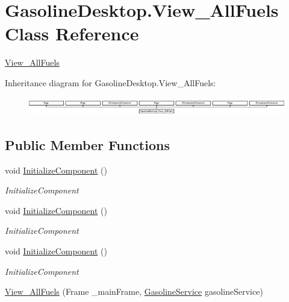 \hypertarget{class_gasoline_desktop_1_1_view___all_fuels}{}\section{Gasoline\+Desktop.\+View\+\_\+\+All\+Fuels Class Reference}
\label{class_gasoline_desktop_1_1_view___all_fuels}


\mbox{\hyperlink{class_gasoline_desktop_1_1_view___all_fuels}{View\+\_\+\+All\+Fuels}}  


Inheritance diagram for Gasoline\+Desktop.\+View\+\_\+\+All\+Fuels\+:\begin{figure}[H]
\begin{center}
\leavevmode
\includegraphics[height=0.804020cm]{class_gasoline_desktop_1_1_view___all_fuels}
\end{center}
\end{figure}
\subsection*{Public Member Functions}
\begin{DoxyCompactItemize}
\item 
void \mbox{\hyperlink{class_gasoline_desktop_1_1_view___all_fuels_a5b5ef4ae6f2ee05ce8ec6b8af1ba331f}{Initialize\+Component}} ()
\begin{DoxyCompactList}\small\item\em Initialize\+Component \end{DoxyCompactList}\item 
void \mbox{\hyperlink{class_gasoline_desktop_1_1_view___all_fuels_a5b5ef4ae6f2ee05ce8ec6b8af1ba331f}{Initialize\+Component}} ()
\begin{DoxyCompactList}\small\item\em Initialize\+Component \end{DoxyCompactList}\item 
void \mbox{\hyperlink{class_gasoline_desktop_1_1_view___all_fuels_a5b5ef4ae6f2ee05ce8ec6b8af1ba331f}{Initialize\+Component}} ()
\begin{DoxyCompactList}\small\item\em Initialize\+Component \end{DoxyCompactList}\item 
\mbox{\hyperlink{class_gasoline_desktop_1_1_view___all_fuels_aa2d01afa055940de56665cce196260d5}{View\+\_\+\+All\+Fuels}} (Frame \+\_\+main\+Frame, \mbox{\hyperlink{class_gasoline_desktop_1_1_gasoline_service}{Gasoline\+Service}} gasoline\+Service)
\end{DoxyCompactItemize}


